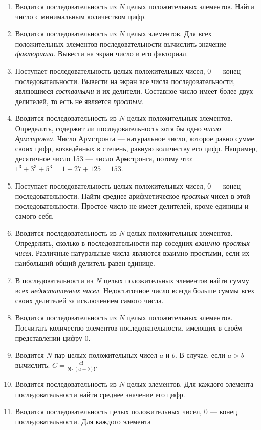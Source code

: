 \begin{enumerate}
\item Вводится последовательность из $N$ целых положительных элементов. Найти число с минимальным количеством цифр.
\item Вводится последовательность из $N$ целых элементов. Для всех положительных элементов последовательности вычислить
значение \emph{факториала}. Вывести на экран число и его факториал.
\item Поступает последовательность целых положительных чисел, 0 --- конец последовательности. Вывести на экран все числа
последовательности, являющиеся \emph{составными} и их делители. Составное число имеет более двух делителей,
то есть не является \emph{простым}.
\item Вводится последовательность из $N$ целых положительных элементов. Определить, содержит ли последовательность хотя бы
одно \emph{число Армстронга}. Число Армстронга --- натуральное число, которое равно сумме своих цифр,
возведённых в степень, равную количеству его цифр. Например, десятичное число 153 --- число Армстронга, потому что: 
$1^3+3^3+5^3=1+27+125=153.$ 
\item Поступает последовательность целых положительных чисел, 0 --- конец последовательности. Найти среднее арифметическое
\emph{простых} чисел в этой последовательности. Простое число не имеет делителей, кроме единицы и самого
себя.
\item Вводится последовательность из $N$ целых положительных элементов. Определить, сколько в последовательности пар
соседних \emph{взаимно простых чисел}. Различные натуральные числа являются взаимно простыми, если их
наибольший общий делитель равен единице.
\item В последовательности из $N$ целых положительных элементов найти сумму всех \emph{недостаточных чисел}.
Недостаточное число всегда больше суммы всех своих делителей за исключением самого числа.
\item Вводится последовательность из $N$ целых положительных элементов. Посчитать количество элементов последовательности,
имеющих в своём представлении цифру 0.
\item Вводится $N$ пар целых положительных чисел $a$ и $b$. В случае, если
$a>b$ вычислить:
 $C=\frac{a!}{b!\cdot (a-b)!}$.
\item Вводится последовательность из $N$ целых элементов. Для каждого элемента последовательности найти среднее значение
его цифр.
\item Вводится последовательность целых положительных чисел, 0 --- конец последовательности. Для каждого элемента

\end{enumerate}
